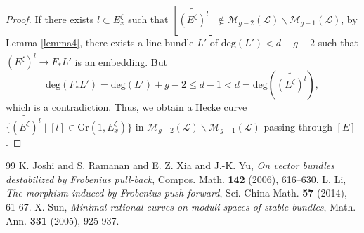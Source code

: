 \documentclass[10pt,a4paper]{amsart}
\begin{document}
\begin{proof}
If there exists $l\subset E_x^\zeta$ such that $[\widetilde{(E^\zeta)^l}] \notin \mathcal{M}_{g-2}(\mathcal{L})\backslash\mathcal{M}_{g-1}(\mathcal{L})$, by Lemma \ref{lemma4}, there exists a line bundle $L'$ of $\mathrm{deg}(L')<d-g+2$ such that  $\widetilde{(E^\zeta)^l} \to F_*L'$ is an embedding. But 
$$ \mathrm{deg}(F_*L') = \mathrm{deg}(L') + g-2 \leqslant d-1 < d =\mathrm{deg}(\widetilde{(E^\zeta)^l}),$$
which is a contradiction. Thus, we obtain a Hecke curve $\{\widetilde{(E^\zeta)^l} \mid  [l] \in \mathrm{Gr}(1,E_x^\zeta)\}$ in $\mathcal{M}_{g-2}(\mathcal{L})\backslash\mathcal{M}_{g-1}(\mathcal{L})$ passing through $[E]$.

\end{proof}

\begin{thebibliography}{99}
 K. Joshi and S. Ramanan and E. Z. Xia and J.-K. Yu, {\it On vector bundles destabilized by Frobenius pull-back}, Compos. Math. {\bf 142} (2006), 616--630.
 L. Li, {\it The morphism induced by Frobenius push-forward}, Sci. China Math. {\bf 57} (2014), 61-67.
 X. Sun, {\it Minimal rational curves on moduli spaces of stable bundles}, Math. Ann. {\bf 331} (2005), 925-937.
\end{thebibliography}
\end{document}
